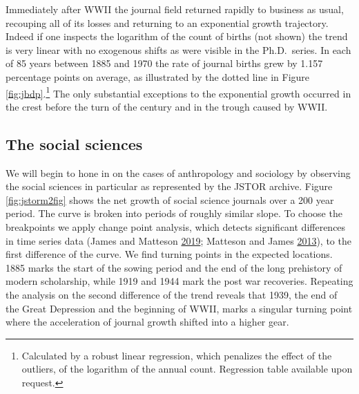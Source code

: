 \documentclass[]{book}
\let\rmarkdownfootnote\footnote%
\def\footnote{\protect\rmarkdownfootnote}
\theoremstyle{definition}
\theoremstyle{definition}
\theoremstyle{definition}
\theoremstyle{remark}
\begin{document}
Immediately after WWII the journal field returned rapidly to business as
usual, recouping all of its losses and returning to an exponential
growth trajectory. Indeed if one inspects the logarithm of the count of
births (not shown) the trend is very linear with no exogenous shifts as
were visible in the Ph.D.~series. In each of 85 years between 1885 and
1970 the rate of journal births grew by 1.157 percentage points on
average, as illustrated by the dotted line in Figure
\ref{fig:jbdp}.\footnote{Calculated by a robust linear regression, which
  penalizes the effect of the outliers, of the logarithm of the annual
  count. Regression table available upon request.} The only substantial
exceptions to the exponential growth occurred in the crest before the
turn of the century and in the trough caused by WWII.

\hypertarget{the-social-sciences}{%
\subsection{The social sciences}\label{the-social-sciences}}

We will begin to hone in on the cases of anthropology and sociology by
observing the social sciences in particular as represented by the JSTOR
archive. Figure \ref{fig:jstorm2fig} shows the net growth of social
science journals over a 200 year period. The curve is broken into
periods of roughly similar slope. To choose the breakpoints we apply
change point analysis, which detects significant differences in time
series data (James and Matteson
\protect\hyperlink{ref-James2019ecp}{2019}; Matteson and James
\protect\hyperlink{ref-Matteson2013Nonparametric}{2013}), to the first
difference of the curve. We find turning points in the expected
locations. 1885 marks the start of the sowing period and the end of the
long prehistory of modern scholarship, while 1919 and 1944 mark the post
war recoveries. Repeating the analysis on the second difference of the
trend reveals that 1939, the end of the Great Depression and the
beginning of WWII, marks a singular turning point where the acceleration
of journal growth shifted into a higher gear.
\end{document}
